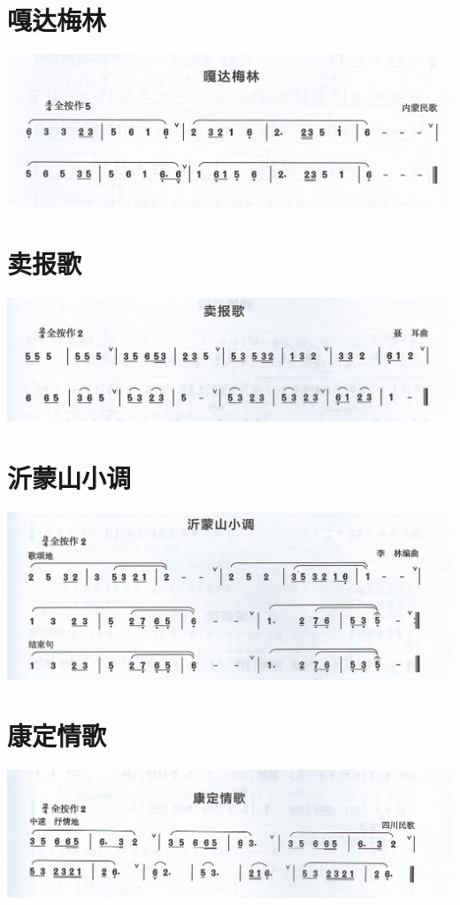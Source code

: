 \documentclass[cn,pad,chinese,chinesefont=nofont]{elegantbook}
\begin{document}
\section{嘎达梅林}
\includegraphics[width=\textwidth]{dongxiao/Scan 17-3.jpeg}

\section{卖报歌}
\includegraphics[width=\textwidth]{dongxiao/Scan 18-1.jpeg}
\section{沂蒙山小调}
\includegraphics[width=\textwidth]{dongxiao/Scan 18-2.jpeg}
\section{康定情歌}
\includegraphics[width=\textwidth]{dongxiao/Scan 18-3.jpeg}
\end{document}
